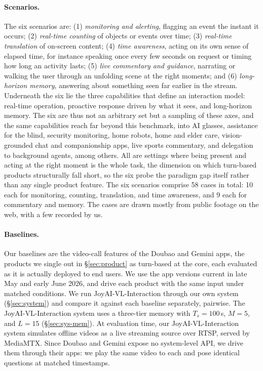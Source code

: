 \documentclass{llmxive}
\begin{document}
\paragraph{\textbf{Scenarios.}} The six scenarios are: (1) \textit{monitoring and alerting}, flagging an event the instant it occurs; (2) \textit{real-time counting} of objects or events over time; (3) \textit{real-time translation} of on-screen content; (4) \textit{time awareness}, acting on its own sense of elapsed time, for instance speaking once every few seconds on request or timing how long an activity lasts; (5) \textit{live commentary and guidance}, narrating or walking the user through an unfolding scene at the right moments; and (6) \textit{long-horizon memory}, answering about something seen far earlier in the stream. Underneath the six lie the three capabilities that define an interaction model: real-time operation, proactive response driven by what it sees, and long-horizon memory. The six are thus not an arbitrary set but a sampling of these axes, and the same capabilities reach far beyond this benchmark, into AI glasses, assistance for the blind, security monitoring, home robots, home and elder care, vision-grounded chat and companionship apps, live sports commentary, and delegation to background agents, among others. All are settings where being present and acting at the right moment is the whole task, the dimension on which turn-based products structurally fall short, so the six probe the paradigm gap itself rather than any single product feature.
The six scenarios comprise 58 cases in total: 10 each for monitoring, counting, translation, and time awareness, and 9 each for commentary and memory. 
The cases are drawn mostly from public footage on the web, with a few recorded by us.

\paragraph{\textbf{Baselines.}} Our baselines are the video-call features of the Doubao and Gemini apps, the products we single out in \S\ref{sec:product} as turn-based at the core, each evaluated as it is actually deployed to end users. We use the app versions current in late May and early June 2026, and drive each product with the same input under matched conditions. We run JoyAI-VL-Interaction through our own system (\S\ref{sec:system}) and compare it against each baseline separately, pairwise. 
The JoyAI-VL-Interaction system uses a three-tier memory with $T_s=100$\,s, $M=5$, and $L=15$ (\S\ref{sec:sys-mem}).
At evaluation time, our JoyAI-VL-Interaction system simulates offline videos as a live streaming source over RTSP, served by MediaMTX.
Since Doubao and Gemini expose no system-level API, we drive them through their apps: we play the same video to each and pose identical questions at matched timestamps.
\end{document}
